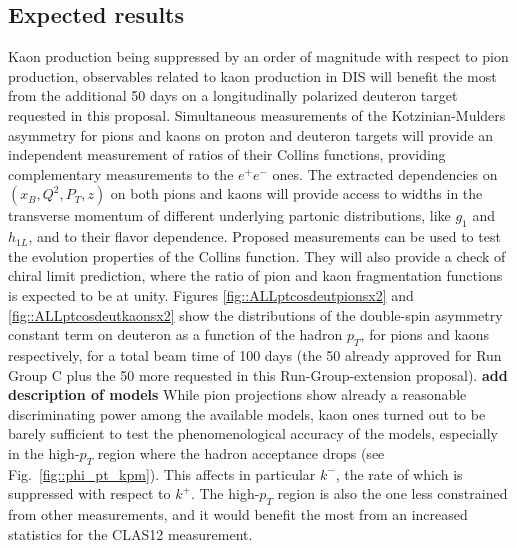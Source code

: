 \subsection{Expected results}
%
Kaon production being suppressed by an order of magnitude with respect to pion production, observables related to kaon production in DIS will benefit the most from the additional 50 days on a longitudinally polarized deuteron target requested in this proposal. Simultaneous measurements of the Kotzinian-Mulders asymmetry for pions and kaons on proton and deuteron targets will provide an independent measurement of ratios of their Collins functions, providing complementary measurements to the $e^+e^-$ ones. 
The extracted dependencies on $(x_B, Q^2, P_T, z)$ on both pions and kaons will provide access to widths in the transverse momentum of different underlying partonic distributions, like $g_1$ and $h_{1L}$, and to their flavor dependence. Proposed measurements can be used to test the evolution properties of the Collins function. They will also provide a check of chiral limit prediction, where the ratio of pion and kaon fragmentation functions is expected to be at unity.
Figures \ref{fig::ALLptcosdeutpionsx2} and \ref{fig::ALLptcosdeutkaonsx2} show the distributions of the double-spin asymmetry constant term on deuteron as a function of the hadron $p_T$, for pions and kaons respectively, for a total beam time of 100 days (the 50 already approved for Run Group C plus the 50 more requested in this Run-Group-extension proposal).
\textbf{add description of models}
While pion projections show already a reasonable discriminating power among the available models, kaon ones turned out to be barely sufficient to test the phenomenological accuracy of the models, especially in the high-$p_T$ region where the hadron acceptance drops (see Fig.~\ref{fig::phi_pt_kpm}). This affects in particular $k^-$, the rate of which is suppressed with respect to $k^+$.
The high-$p_T$ region is also the one less constrained from other measurements, and it would benefit the most from an increased statistics for the CLAS12 measurement.
%
